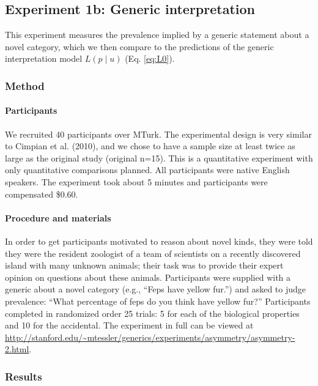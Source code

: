 \documentclass[floatsintext,doc]{apa6}
\theoremstyle{definition}
\theoremstyle{definition}
\theoremstyle{definition}
\theoremstyle{remark}
\begin{document}
\subsection{Experiment 1b: Generic
interpretation}\label{experiment-1b-generic-interpretation}

This experiment measures the prevalence implied by a generic statement
about a novel category, which we then compare to the predictions of the
generic interpretation model \(L(p \mid u)\) (Eq. \ref{eq:L0}).

\subsubsection{Method}\label{method-1}

\paragraph{Participants}\label{participants-1}

We recruited 40 participants over MTurk. The experimental design is very
similar to Cimpian et al. (2010), and we chose to have a sample size at
least twice as large as the original study (original n=15). This is a
quantitative experiment with only quantitative comparisons planned. All
participants were native English speakers. The experiment took about 5
minutes and participants were compensated \$0.60.

\paragraph{Procedure and materials}\label{procedure-and-materials-1}

In order to get participants motivated to reason about novel kinds, they
were told they were the resident zoologist of a team of scientists on a
recently discovered island with many unknown animals; their task was to
provide their expert opinion on questions about these animals.
Participants were supplied with a generic about a novel category (e.g.,
\enquote{Feps have yellow fur.}) and asked to judge prevalence:
\enquote{What percentage of feps do you think have yellow fur?}
Participants completed in randomized order 25 trials: 5 for each of the
biological properties and 10 for the accidental. The experiment in full
can be viewed at
\url{http://stanford.edu/~mtessler/generics/experiments/asymmetry/asymmetry-2.html}.

\subsubsection{Results}\label{results}
\end{document}
